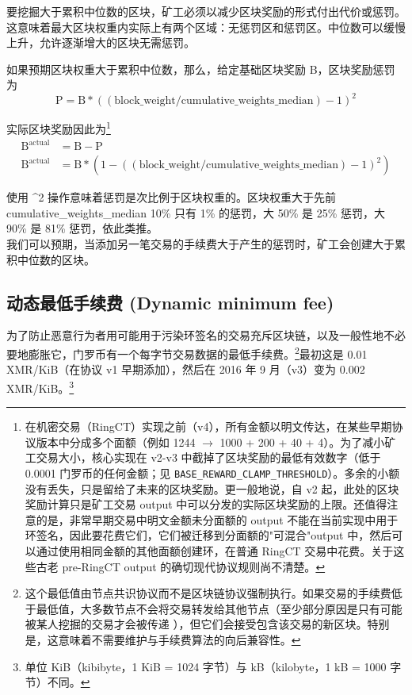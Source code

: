 要挖掘大于累积中位数的区块，矿工必须以减少区块奖励的形式付出代价或惩罚。这意味着最大区块权重内实际上有两个区域：无惩罚区和惩罚区。中位数可以缓慢上升，允许逐渐增大的区块无需惩罚。

如果预期区块权重大于累积中位数，那么，给定基础区块奖励 B，区块奖励惩罚为\vspace{.1cm}
\[\textrm{P} = \textrm{B}*((\textrm{block\_weight}/\textrm{cumulative\_weights\_median}) - 1)^2\]

实际区块奖励因此为\footnote{在机密交易（RingCT）实现之前（v4），所有金额以明文传达，在某些早期协议版本中分成多个面额（例如 1244 $\rightarrow$ 1000 + 200 + 40 + 4）。为了减小矿工交易大小，核心实现在 v2-v3 中截掉了区块奖励的最低有效数字（低于 0.0001 门罗币的任何金额；见 {\tt BASE\_REWARD\_CLAMP\_THRESHOLD}）。多余的小额没有丢失，只是留给了未来的区块奖励。更一般地说，自 v2 起，此处的区块奖励计算只是矿工交易 output 中可以分发的实际区块奖励的上限。还值得注意的是，非常早期交易中明文金额{未}分面额的 output 不能在当前实现中用于环签名，因此要花费它们，它们被迁移到分面额的"可混合"output 中，然后可以通过使用相同金额的其他面额创建环，在普通 RingCT 交易中花费。关于这些古老 pre-RingCT output 的确切现代协议规则尚不清楚。}\vspace{.3cm}
\begin{align*}
    \textrm{B}^{\textrm{actual}} &= \textrm{B} - \textrm{P} \\
    \textrm{B}^{\textrm{actual}} &= \textrm{B}*(1-((\textrm{block\_weight}/\textrm{cumulative\_weights\_median}) - 1)^2)
\end{align*}

使用 \^{}2 操作意味着惩罚是次比例于区块权重的。区块权重大于先前 cumulative\_weights\_median 10\% 只有 1\% 的惩罚，大 50\% 是 25\% 惩罚，大 90\% 是 81\% 惩罚，依此类推。\cite{monero-coin-emission}\\

我们可以预期，当添加另一笔交易的手续费大于产生的惩罚时，矿工会创建大于累积中位数的区块。


\subsection{动态最低手续费 (Dynamic minimum fee)}
\label{subsec:dynamic-minimum-fee} %

为了防止恶意行为者用可能用于污染环签名的交易充斥区块链，以及一般性地不必要地膨胀它，门罗币有一个每字节交易数据的最低手续费。\footnote{这个最低值由节点共识协议而不是区块链协议强制执行。如果交易的手续费低于最低值，大多数节点不会将交易转发给其他节点（至少部分原因是只有可能被某人挖掘的交易才会被传递 \cite{articmine-36c3-dynamics}），但它们{会}接受包含该交易的新区块。特别是，这意味着不需要维护与手续费算法的向后兼容性。}最初这是 0.01 XMR/KiB（在协议 v1 早期添加）\cite{fee-old-stackexchange}，然后在 2016 年 9 月（v3）变为 0.002 XMR/KiB。\footnote{单位 KiB（kibibyte，1 KiB = 1024 字节）与 kB（kilobyte，1 kB = 1000 字节）不同。}%

